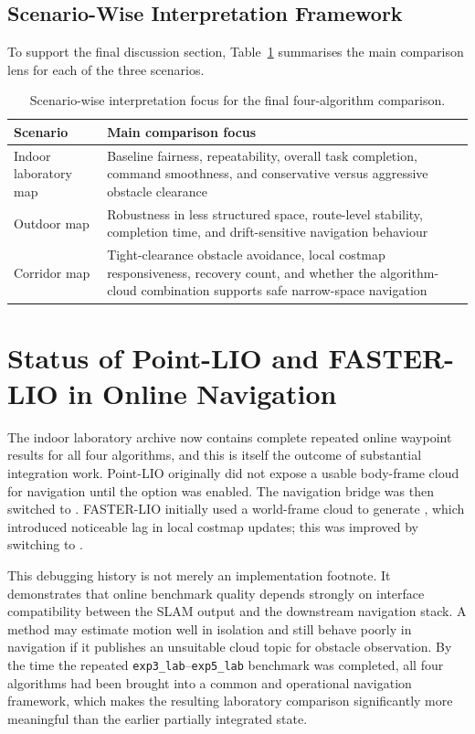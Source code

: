 \documentclass[12pt,a4paper]{report}
\begin{document}
\subsection{Scenario-Wise Interpretation Framework}
To support the final discussion section, Table~\ref{tab:scenario-focus} summarises the main comparison lens for each of the three scenarios.

\begin{table}[H]
\centering
\caption{Scenario-wise interpretation focus for the final four-algorithm comparison.}
\label{tab:scenario-focus}
\begin{tabular}{p{3cm}p{10cm}}
\toprule
Scenario & Main comparison focus \\
\midrule
Indoor laboratory map & Baseline fairness, repeatability, overall task completion, command smoothness, and conservative versus aggressive obstacle clearance \\
Outdoor map & Robustness in less structured space, route-level stability, completion time, and drift-sensitive navigation behaviour \\
Corridor map & Tight-clearance obstacle avoidance, local costmap responsiveness, recovery count, and whether the algorithm-cloud combination supports safe narrow-space navigation \\
\bottomrule
\end{tabular}
\end{table}

\section{Status of Point-LIO and FASTER-LIO in Online Navigation}
The indoor laboratory archive now contains complete repeated online waypoint results for all four algorithms, and this is itself the outcome of substantial integration work. Point-LIO originally did not expose a usable body-frame cloud for navigation until the  option was enabled. The navigation bridge was then switched to . FASTER-LIO initially used a world-frame cloud to generate , which introduced noticeable lag in local costmap updates; this was improved by switching to .

This debugging history is not merely an implementation footnote. It demonstrates that online benchmark quality depends strongly on interface compatibility between the SLAM output and the downstream navigation stack. A method may estimate motion well in isolation and still behave poorly in navigation if it publishes an unsuitable cloud topic for obstacle observation. By the time the repeated \texttt{exp3\_lab}--\texttt{exp5\_lab} benchmark was completed, all four algorithms had been brought into a common and operational navigation framework, which makes the resulting laboratory comparison significantly more meaningful than the earlier partially integrated state.
\end{document}
